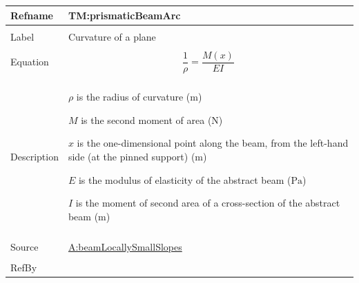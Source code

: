 \documentclass[12pt]{article}
\begin{document}
\begin{minipage}{\textwidth}
\begin{tabular}{>{\raggedright}p{}>{\raggedright\arraybackslash}p{}}
\toprule \textbf{Refname} & \textbf{TM:prismaticBeamArc}
\label{TM:prismaticBeamArc}
\\ \midrule \\
Label & Curvature of a plane
        
\\ \midrule \\
Equation & \begin{displaymath}
           \frac{1}{ρ}=\frac{M\left(x\right)}{E I}
           \end{displaymath}
\\ \midrule \\
Description & \begin{symbDescription}
              \item{$ρ$ is the radius of curvature (${\text{m}}$)}
              \item{$M$ is the second moment of area (${\text{N}}$)}
              \item{$x$ is the one-dimensional point along the beam, from the left-hand side (at the pinned support) (${\text{m}}$)}
              \item{$E$ is the modulus of elasticity of the abstract beam (${\text{Pa}}$)}
              \item{$I$ is the moment of second area of a cross-section of the abstract beam (${\text{m}}$)}
              \end{symbDescription}
\\ \midrule \\
Source & \hyperref[beamLocallySmallSlopes]{A:beamLocallySmallSlopes}
         
\\ \midrule \\
RefBy & 
\\ \bottomrule
\end{tabular}
\end{minipage}
\vspace{\baselineskip}
\noindent
\end{document}
